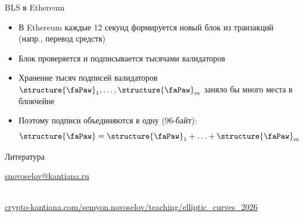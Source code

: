 \documentclass{beamer}
\begin{document}
\begin{frame}{BLS в Ethereum}
\begin{itemize}
	\item В Ethereum каждые 12 секунд формируется новый блок из транзакций (напр., перевод средств)
	\item Блок проверяется и подписывается тысячами валидаторов
	\item Хранение тысяч подписей валидаторов $\text{\structure{\faPaw}}_1, \ldots, \text{\structure{\faPaw}}_m$ заняло бы много места в блокчейне
	\item Поэтому подписи объединяются в одну (96-байт):
	\[
	\text{\structure{\faPaw}} = \text{\structure{\faPaw}}_1 + \ldots +  \text{\structure{\faPaw}}_m
	\]
	
\end{itemize}
\end{frame}

\begin{frame}{Литература}
\nocite{Menezes1993}\nocite{Blake1999}\nocite{Washington2008}
\renewcommand*{\bibfont}{\scriptsize}
\printbibliography

\begin{center}
    \begin{tcolorbox}[enhanced,hbox,colback=block-green-color-bg,colframe=subsection-color!120,title=Контакты,center title]
        \begin{varwidth}{\textwidth}
            \begin{center}
                \href{mailto:snovoselov@kantiana.ru}{snovoselov@kantiana.ru}
            \end{center}
        \end{varwidth}
    \end{tcolorbox}	
\end{center}

\\
{\footnotesize
    \href{https://crypto-kantiana.com/semyon.novoselov/teaching/elliptic_curves_2026}{crypto-kantiana.com/semyon.novoselov/teaching/elliptic\_curves\_2026}
}
\end{frame}
\end{document}
